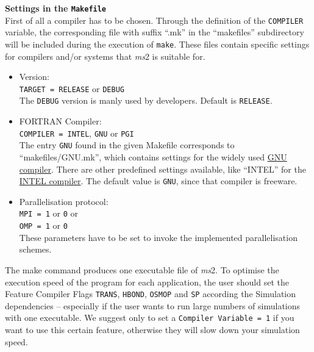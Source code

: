 \textbf{Settings in the \texttt{Makefile}}\\
First of all a compiler has to be chosen. Through the definition of the \texttt{COMPILER} variable, the corresponding file with suffix ``.mk'' in the ``makefiles'' subdirectory will be included during the execution of \texttt{make}. These files contain specific settings for compilers and/or systems that \textit{ms}2 is suitable for.\\
\begin{itemize}
	\item Version:\\
	\texttt{TARGET~=~RELEASE} or \texttt{DEBUG}\\
	The \texttt{DEBUG} version is manly used by developers. Default is \texttt{RELEASE}.
	\item FORTRAN Compiler:\\
	\texttt{COMPILER~=~INTEL}, \texttt{GNU} or \texttt{PGI}\\
	The entry \texttt{GNU} found in the given Makefile corresponds to ``makefiles/GNU.mk'', which contains settings for the widely used \href{http://www.gnu.org/software/gcc/}{GNU compiler}. There are other predefined settings available, like ``INTEL'' for the \href{https://software.intel.com/en-us/intel-compilers}{INTEL compiler}. The default value is \texttt{GNU}, since that compiler is freeware. 
	\item Parallelisation protocol:\\
	\texttt{MPI~=~1} or \texttt{0} or \\
	\texttt{OMP~=~1} or \texttt{0}\\
	These parameters have to be set to invoke the implemented parallelisation schemes. 
\end{itemize}
The make command produces one executable file of \textit{ms}2. To optimise the execution speed of the program for each application, the user should set the Feature Compiler Flags \texttt{TRANS}, \texttt{HBOND}, \texttt{OSMOP} and \texttt{SP} according the Simulation dependencies -- especially if the user wants to run large numbers of simulations with one executable. We suggest only to set a \texttt{Compiler Variable = 1} if you want to use this certain feature, otherwise they will slow down your simulation speed.
